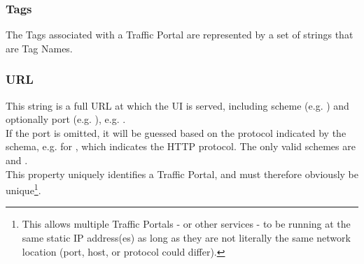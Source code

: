 \subsubsection{Tags}
The Tags associated with a Traffic Portal are represented by a set of strings
that are Tag Names.

\subsubsection{URL}
This string is a full URL at which the UI is served, including scheme (e.g.
) and optionally port (e.g. ), e.g.
.\\
If the port is omitted, it will be guessed based on the protocol indicated by
the schema, e.g.  for , which indicates the HTTP
protocol. The only valid schemes are  and .\\
This property uniquely identifies a Traffic Portal, and must therefore
obviously be unique\footnote{This allows multiple Traffic Portals - or other
services - to be running at the same static IP address(es) as long as they
are not literally the same network location (port, host, or protocol could
differ).}.
